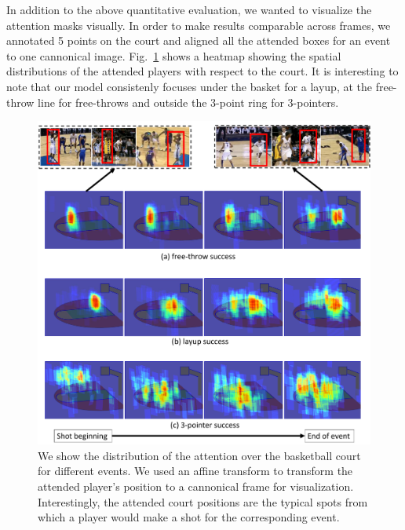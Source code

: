 In addition to the above quantitative evaluation, we wanted to
visualize the attention masks visually.
In order to make results comparable across frames, 
we annotated 5 points on the court and
aligned all the attended boxes for an event to one cannonical image. 
Fig.~\ref{fig:att_heatmap} shows a heatmap  showing the spatial distributions
of the attended players with respect to the court. It is interesting to note that
our model consistenly focuses under the basket for a layup, at the free-throw
line for free-throws and outside the 3-point ring for 3-pointers.



\begin{figure}[t!]
\begin{center}
  \includegraphics[width=7in]{images/heatmap_figure_cropped.pdf}
\end{center}
   \caption{We show the distribution of the attention over the basketball court
     for different events. We used an affine transform to transform the
     attended player's position to a cannonical frame for visualization.
     Interestingly, the attended court positions are the typical spots from
     which a player would make a shot for the corresponding event.
   }
\label{fig:att_heatmap}
\end{figure}
